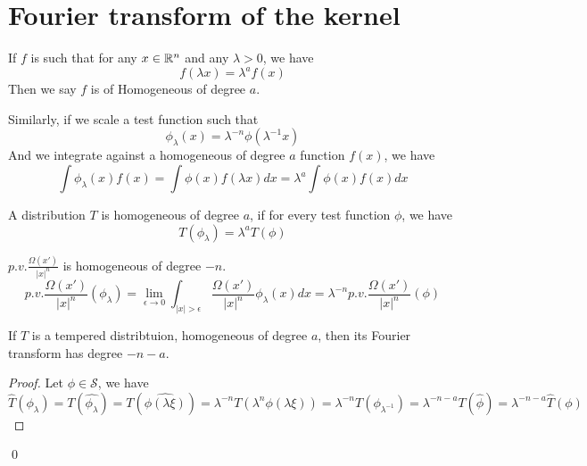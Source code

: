 \section{Fourier transform of the kernel}
\begin{definition}
    If $f$ is such that for any $x\in\mathbb{R}^n$ and any $\lambda>0$, we have
    \begin{equation*}
        f(\lambda x)=\lambda^af(x)
    \end{equation*}
    Then we say $f$ is of Homogeneous of degree $a$.
\end{definition}
Similarly, if we scale a test function such that
\begin{equation*}
    \phi_\lambda(x)=\lambda^{-n}\phi(\lambda^{-1}x)
\end{equation*}
And we integrate against a homogeneous of degree $a$ function $f(x)$, we have
\begin{equation*}
    \int\phi_\lambda(x)f(x)=\int \phi(x)f(\lambda x)dx=\lambda^a\int\phi(x)f(x)dx
\end{equation*}
\begin{definition}
    A distribution $T$ is homogeneous of degree $a$, if for every test function $\phi$, we have
    \begin{equation*}
        T(\phi_\lambda)=\lambda^aT(\phi)
    \end{equation*}
\end{definition}
\begin{exercise}
$p.v.\frac{\Omega(x')}{|x|^n}$ is homogeneous of degree $-n$.
\begin{equation*}
    p.v.\frac{\Omega(x')}{|x|^n}(\phi_\lambda)=\lim_{\epsilon\to 0}\int_{|x|>\epsilon}\frac{\Omega(x')}{|x|^n}\phi_\lambda(x)dx=\lambda^{-n}p.v.\frac{\Omega(x')}{|x|^n}(\phi)
\end{equation*}
\end{exercise}

\begin{proposition}
    If $T$ is a tempered distribtuion, homogeneous of degree $a$, then its Fourier transform has degree $-n-a$.
\end{proposition}
\begin{proof}
    Let $\phi\in\mathcal{S}$, we have
    \begin{equation*}
        \hat{T}(\phi_\lambda)=T(\hat{\phi_\lambda})=T(\hat{\phi(\lambda\xi)})=\lambda^{-n}T(\lambda^n\phi(\lambda\xi))=\lambda^{-n}T(\phi_{\lambda^{-1}})=\lambda^{-n-a}T(\hat{\phi})=\lambda^{-n-a}\hat{T}(\phi)
    \end{equation*}
\end{proof}
\qed

